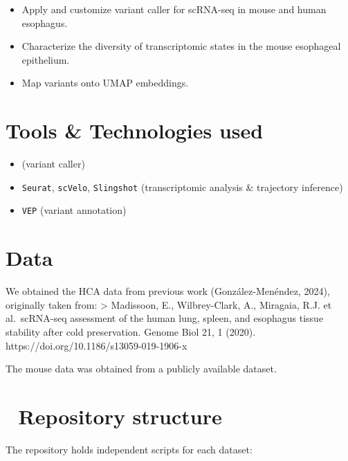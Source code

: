 \documentclass[
  letterpaper,
  DIV=11,
  numbers=noendperiod]{scrreprt}
\providecommand{\tightlist}{%
  \setlength{\itemsep}{0pt}\setlength{\parskip}{0pt}}\usepackage{longtable,booktabs,array}
\begin{document}
\begin{itemize}
\tightlist
\item
  Apply and customize variant caller for scRNA-seq in mouse and human
  esophagus.
\item
  Characterize the diversity of transcriptomic states in the mouse
  esophageal epithelium.
\item
  Map variants onto UMAP embeddings.
\end{itemize}


\chapter{Tools \& Technologies used}\label{tools-technologies-used}

\begin{itemize}
\tightlist
\item
  (variant caller)
\item
  \texttt{Seurat}, \texttt{scVelo}, \texttt{Slingshot} (transcriptomic
  analysis \& trajectory inference)
\item
  \texttt{VEP} (variant annotation)
\end{itemize}


\chapter{Data}\label{data}

We obtained the HCA data from previous work (González-Menéndez, 2024),
originally taken from: \textgreater{} Madissoon, E., Wilbrey-Clark, A.,
Miragaia, R.J. et al.~scRNA-seq assessment of the human lung, spleen,
and esophagus tissue stability after cold preservation. Genome Biol 21,
1 (2020). https://doi.org/10.1186/s13059-019-1906-x

The mouse data was obtained from a publicly available dataset.


\chapter{📁 Repository structure}\label{repository-structure}

The repository holds independent scripts for each dataset:
\end{document}

